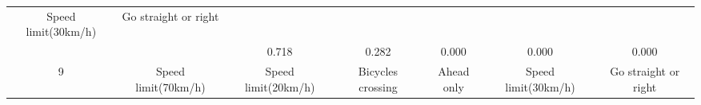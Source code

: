 \documentclass[11pt]{article}
\begin{document}
\begin{longtable}[]{@{}ccccccc@{}}
\begin{minipage}[t]{0.04\columnwidth}
Speed limit(30km/h)\strut
\end{minipage} & \begin{minipage}[t]{0.04\columnwidth}\centering\strut
Go straight or right\strut
\end{minipage}\tabularnewline
\begin{minipage}[t]{0.04\columnwidth}\centering\strut
\strut
\end{minipage} & \begin{minipage}[t]{0.04\columnwidth}\centering\strut
\strut
\end{minipage} & \begin{minipage}[t]{0.04\columnwidth}\centering\strut
0.718\strut
\end{minipage} & \begin{minipage}[t]{0.04\columnwidth}\centering\strut
0.282\strut
\end{minipage} & \begin{minipage}[t]{0.04\columnwidth}\centering\strut
0.000\strut
\end{minipage} & \begin{minipage}[t]{0.04\columnwidth}\centering\strut
0.000\strut
\end{minipage} & \begin{minipage}[t]{0.04\columnwidth}\centering\strut
0.000\strut
\end{minipage}\tabularnewline
\begin{minipage}[t]{0.04\columnwidth}\centering\strut
9\strut
\end{minipage} & \begin{minipage}[t]{0.04\columnwidth}\centering\strut
Speed limit(70km/h)\strut
\end{minipage} & \begin{minipage}[t]{0.04\columnwidth}\centering\strut
Speed limit(20km/h)\strut
\end{minipage} & \begin{minipage}[t]{0.04\columnwidth}\centering\strut
Bicycles crossing\strut
\end{minipage} & \begin{minipage}[t]{0.04\columnwidth}\centering\strut
Ahead only\strut
\end{minipage} & \begin{minipage}[t]{0.04\columnwidth}\centering\strut
Speed limit(30km/h)\strut
\end{minipage} & \begin{minipage}[t]{0.04\columnwidth}\centering\strut
Go straight or right\strut
\end{minipage}\tabularnewline

\end{longtable}
\end{document}
